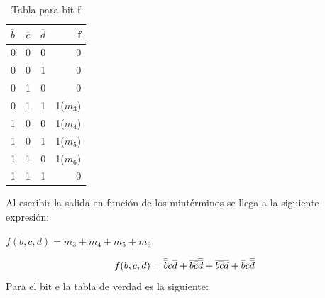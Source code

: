 \begin{table}[H]
	\begin{center}
		\caption{Tabla para bit f}
		\vspace{5mm}
		\begin{tabular}{l|c|c|r}
			\textbf{$\overline{b}$} & \textbf{$\overline{c}$} & \textbf{$\overline{d}$} & \textbf{f} \\
			\hline
			0                       & 0                       & 0                       & 0          \\
			0                       & 0                       & 1                       & 0          \\	
			0                       & 1                       & 0                       & 0          \\
			0                       & 1                       & 1                       & 1($m_{3}$) \\
			1                       & 0                       & 0                       & 1($m_{4}$) \\
			1                       & 0                       & 1                       & 1($m_{5}$) \\	
			1                       & 1                       & 0                       & 1($m_{6}$) \\
			1                       & 1                       & 1                       & 0          \\				
		\end{tabular}
	\end{center}
\end{table}
Al escribir la salida en función de los mintérminos se llega a la siguiente expresión:\\
\centerline{$f(b,c,d)=m_{3}+m_{4}+m_{5}+m_{6}$}
\begin{equation}
	\centerline{$f(b,c,d)=\overline{\overline{b}}\overline{c}\overline{d}+\overline{b}\overline{\overline{c}}\overline{\overline{d}}+\overline{b}\overline{\overline{c}}\overline{d}+\overline{b}\overline{c}\overline{\overline{d}}$}
\end{equation}
Para el bit e la tabla de verdad es la siguiente:\\
